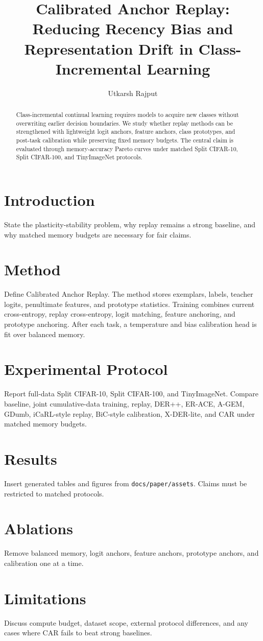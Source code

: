 \documentclass{article}
\title{Calibrated Anchor Replay: Reducing Recency Bias and Representation Drift in Class-Incremental Learning}
\author{Utkarsh Rajput}
\date{}
\begin{document}
\maketitle

\begin{abstract}
Class-incremental continual learning requires models to acquire new classes
without overwriting earlier decision boundaries. We study whether replay methods
can be strengthened with lightweight logit anchors, feature anchors, class
prototypes, and post-task calibration while preserving fixed memory budgets. The
central claim is evaluated through memory-accuracy Pareto curves under matched
Split CIFAR-10, Split CIFAR-100, and TinyImageNet protocols.
\end{abstract}

\section{Introduction}
State the plasticity-stability problem, why replay remains a strong baseline,
and why matched memory budgets are necessary for fair claims.

\section{Method}
Define Calibrated Anchor Replay. The method stores exemplars, labels, teacher
logits, penultimate features, and prototype statistics. Training combines current
cross-entropy, replay cross-entropy, logit matching, feature anchoring, and
prototype anchoring. After each task, a temperature and bias calibration head is
fit over balanced memory.

\section{Experimental Protocol}
Report full-data Split CIFAR-10, Split CIFAR-100, and TinyImageNet. Compare
baseline, joint cumulative-data training, replay, DER++, ER-ACE, A-GEM, GDumb,
iCaRL-style replay, BiC-style calibration, X-DER-lite, and CAR under matched
memory budgets.

\section{Results}
Insert generated tables and figures from \texttt{docs/paper/assets}. Claims must
be restricted to matched protocols.

\section{Ablations}
Remove balanced memory, logit anchors, feature anchors, prototype anchors, and
calibration one at a time.

\section{Limitations}
Discuss compute budget, dataset scope, external protocol differences, and any
cases where CAR fails to beat strong baselines.
\end{document}
